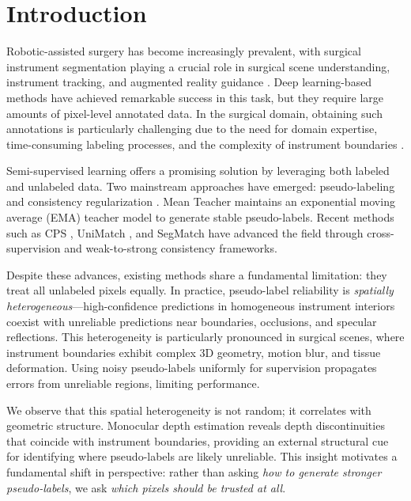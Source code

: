\documentclass[conference]{IEEEtran}
\begin{document}
\section{Introduction}

Robotic-assisted surgery has become increasingly prevalent, with surgical instrument segmentation playing a crucial role in surgical scene understanding, instrument tracking, and augmented reality guidance \cite{allan20192017}. Deep learning-based methods have achieved remarkable success in this task, but they require large amounts of pixel-level annotated data. In the surgical domain, obtaining such annotations is particularly challenging due to the need for domain expertise, time-consuming labeling processes, and the complexity of instrument boundaries \cite{wang2021cross}.

Semi-supervised learning offers a promising solution by leveraging both labeled and unlabeled data. Two mainstream approaches have emerged: pseudo-labeling \cite{lee2013pseudo,zhang2021flexmatch} and consistency regularization \cite{tarvainen2017mean,berthelot2019mixmatch}. Mean Teacher \cite{tarvainen2017mean} maintains an exponential moving average (EMA) teacher model to generate stable pseudo-labels. Recent methods such as CPS \cite{chen2021cps}, UniMatch \cite{yang2023unimatch}, and SegMatch \cite{segmatch2025} have advanced the field through cross-supervision and weak-to-strong consistency frameworks.

Despite these advances, existing methods share a fundamental limitation: they treat all unlabeled pixels equally. In practice, pseudo-label reliability is \emph{spatially heterogeneous}—high-confidence predictions in homogeneous instrument interiors coexist with unreliable predictions near boundaries, occlusions, and specular reflections. This heterogeneity is particularly pronounced in surgical scenes, where instrument boundaries exhibit complex 3D geometry, motion blur, and tissue deformation. Using noisy pseudo-labels uniformly for supervision propagates errors from unreliable regions, limiting performance.

We observe that this spatial heterogeneity is not random; it correlates with geometric structure. Monocular depth estimation \cite{ranftl2021vision} reveals depth discontinuities that coincide with instrument boundaries, providing an external structural cue for identifying where pseudo-labels are likely unreliable. This insight motivates a fundamental shift in perspective: rather than asking \emph{how to generate stronger pseudo-labels}, we ask \emph{which pixels should be trusted at all}.
\end{document}
